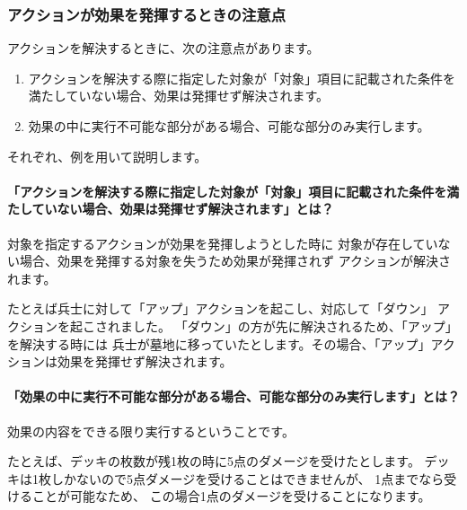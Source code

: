 \documentclass[letterpaper,10pt,dvipdfmx]{sphinxmanual}
\begin{document}
\subsubsection{アクションが効果を発揮するときの注意点}
\label{\detokenize{common/03-action:id12}}
アクションを解決するときに、次の注意点があります。
\begin{enumerate}
%
\item {} 
アクションを解決する際に指定した対象が「対象」項目に記載された条件を満たしていない場合、効果は発揮せず解決されます。

\item {} 
効果の中に実行不可能な部分がある場合、可能な部分のみ実行します。

\end{enumerate}

それぞれ、例を用いて説明します。


\paragraph{「アクションを解決する際に指定した対象が「対象」項目に記載された条件を満たしていない場合、効果は発揮せず解決されます」とは？}
\label{\detokenize{common/03-action:id13}}
対象を指定するアクションが効果を発揮しようとした時に
対象が存在していない場合、効果を発揮する対象を失うため効果が発揮されず
アクションが解決されます。

たとえば兵士に対して「アップ」アクションを起こし、対応して「ダウン」
アクションを起こされました。
「ダウン」の方が先に解決されるため、「アップ」を解決する時には
兵士が墓地に移っていたとします。その場合、「アップ」アクションは効果を発揮せず解決されます。


\paragraph{「効果の中に実行不可能な部分がある場合、可能な部分のみ実行します」とは？}
\label{\detokenize{common/03-action:id14}}
効果の内容をできる限り実行するということです。

たとえば、デッキの枚数が残1枚の時に5点のダメージを受けたとします。
デッキは1枚しかないので5点ダメージを受けることはできませんが、
1点までなら受けることが可能なため、
この場合1点のダメージを受けることになります。
\end{document}

